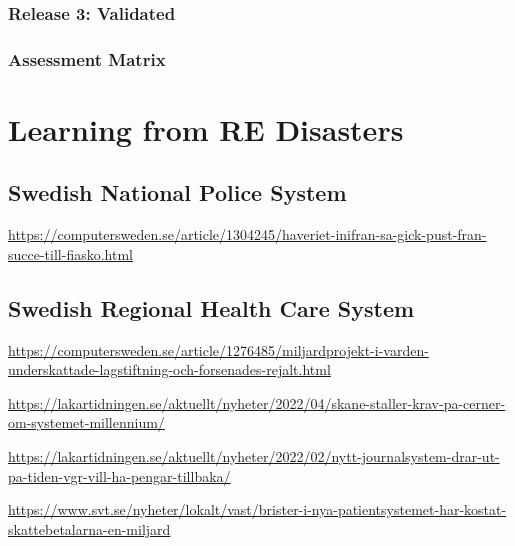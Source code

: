 \documentclass{reqengbook}
\begin{document}
\subsection{Release 3: Validated}
\subsection{Assessment Matrix}


\chapter{Learning from RE Disasters}

\section{Swedish National Police System}

\url{https://computersweden.se/article/1304245/haveriet-inifran-sa-gick-pust-fran-succe-till-fiasko.html}

\section{Swedish Regional Health Care System}

\url{https://computersweden.se/article/1276485/miljardprojekt-i-varden-underskattade-lagstiftning-och-forsenades-rejalt.html}

\url{https://lakartidningen.se/aktuellt/nyheter/2022/04/skane-staller-krav-pa-cerner-om-systemet-millennium/}

\url{https://lakartidningen.se/aktuellt/nyheter/2022/02/nytt-journalsystem-drar-ut-pa-tiden-vgr-vill-ha-pengar-tillbaka/}

\url{https://www.svt.se/nyheter/lokalt/vast/brister-i-nya-patientsystemet-har-kostat-skattebetalarna-en-miljard}
\end{document}
